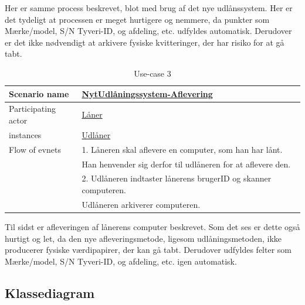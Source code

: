 \documentclass[a4paper]{article}
\begin{document}
Her er samme process beskrevet, blot med brug af det nye udlånssystem. Her er det tydeligt at processen er meget hurtigere og nemmere, da punkter som Mærke/model, S/N Tyveri-ID, og afdeling, etc. udfyldes automatisk. Derudover er det ikke nødvendigt at arkivere fysiske kvitteringer, der har risiko for at gå tabt.
\newpage
\begin{table}[h]
\caption{Use-case 3}
\begin{tabular}{ll}
Scenario name                 & \underline{NytUdlåningssystem-Aflevering} \\ \hline
Participating actor           & \underline{Låner} \\
instances                     & \underline{Udlåner}\\ \hline
Flow of evnets                & 1. Låneren skal aflevere en computer, som han har lånt.
\\& Han henvender sig derfor til udlåneren for at aflevere den.
\\& 2. Udlåneren indtaster lånerens brugerID og skanner computeren.
\\& Udlåneren arkiverer computeren.
\end{tabular}
\end{table}
Til sidst er afleveringen af lånerens computer beskrevet. Som det ses er dette også hurtigt og let, da den nye afleveringsmetode, ligesom udlåningsmetoden, ikke producerer fysiske værdipapirer, der kan gå tabt. Derudover udfyldes felter som Mærke/model, S/N Tyveri-ID, og afdeling, etc. igen automatisk. \\
\subsection{Klassediagram}
\end{document}

